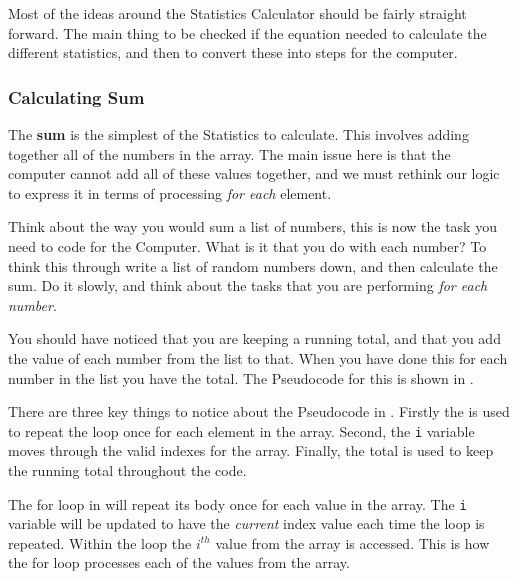 Most of the ideas around the Statistics Calculator should be fairly straight forward. The main thing to be checked if the equation needed to calculate the different statistics, and then to convert these into steps for the computer.

\subsubsection{Calculating Sum} %
\label{ssub:calculating_sum}

The \textbf{sum} is the simplest of the Statistics to calculate. This involves adding together all of the numbers in the array. The main issue here is that the computer cannot add all of these values together, and we must rethink our logic to express it in terms of processing \emph{for each} element.

Think about the way you would sum a list of numbers, this is now the task you need to code for the Computer. What is it that you do with each number? To think this through write a list of random numbers down, and then calculate the sum. Do it slowly, and think about the tasks that you are performing \emph{for each number}.

You should have noticed that you are keeping a running total, and that you add the value of each number from the list to that. When you have done this for each number in the list you have the total. The Pseudocode for this is shown in .




There are three key things to notice about the Pseudocode in . Firstly the  is used to repeat the loop once for each element in the array. Second, the \texttt{i} variable moves through the valid indexes for the array. Finally, the total is used to keep the running total throughout the code.

The for loop in  will repeat its body once for each value in the array. The \texttt{i} variable will be updated to have the \emph{current} index value each time the loop is repeated. Within the loop the $i^{th}$ value from the array is accessed. This is how the for loop processes each of the values from the array.

